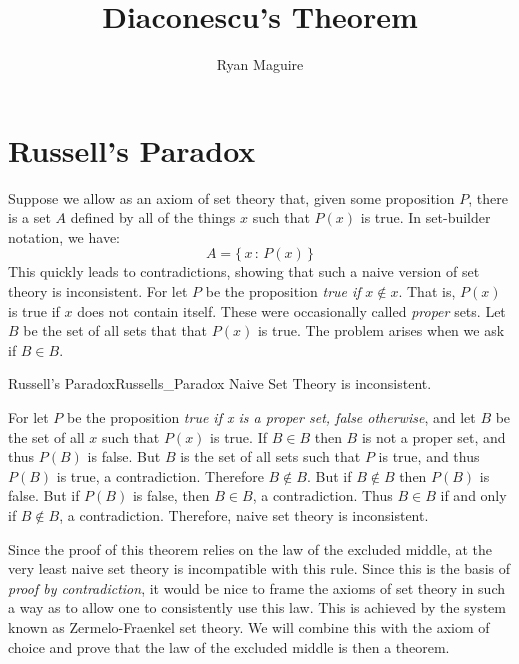 \documentclass[crop=false,class=article]{standalone}                           %
\begin{document}
    \title{Diaconescu's Theorem}
    \author{Ryan Maguire}
    \date{\vspace{-5ex}}
    \maketitle
    \tableofcontents
    \vspace{10ex}
    \section{Russell's Paradox}
        Suppose we allow as an axiom of set theory that, given some
        proposition $P$, there is a set $A$ defined by all of the things
        $x$ such that $P(x)$ is true. In set-builder notation, we have:
        \begin{equation}
            A=\{\,x\,:\,P(x)\,\}
        \end{equation}
        This quickly leads to contradictions, showing that such a naive
        version of set theory is inconsistent. For let $P$ be the
        proposition \textit{true if} $x\notin{x}$. That is, $P(x)$ is true if
        $x$ does not contain itself. These were occasionally called
        \textit{proper} sets. Let $B$ be the set of all sets that
        that $P(x)$ is true. The problem arises when we ask if $B\in{B}$.
        \begin{ftheorem}{Russell's Paradox}{Russells_Paradox}
            Naive Set Theory is inconsistent.
        \end{ftheorem}
        \begin{bproof}
            For let $P$ be the proposition
            \textit{true if x is a proper set, false otherwise}, and let $B$ be
            the set of all $x$ such that $P(x)$ is true. If $B\in{B}$ then
            $B$ is not a proper set, and thus $P(B)$ is false. But $B$ is the
            set of all sets such that $P$ is true, and thus $P(B)$ is true, a
            contradiction. Therefore $B\notin{B}$. But if $B\notin{B}$ then
            $P(B)$ is false. But if $P(B)$ is false, then $B\in{B}$, a
            contradiction. Thus $B\in{B}$ if and only if $B\notin{B}$, a
            contradiction. Therefore, naive set theory is inconsistent.
        \end{bproof}
        Since the proof of this theorem relies on the law of the excluded middle,
        at the very least naive set theory is incompatible with this rule. Since
        this is the basis of \textit{proof by contradiction}, it would be nice
        to frame the axioms of set theory in such a way as to allow one to
        consistently use this law. This is achieved by the system known as
        Zermelo-Fraenkel set theory. We will combine this with the axiom of
        choice and prove that the law of the excluded middle is then a theorem.
\end{document}
